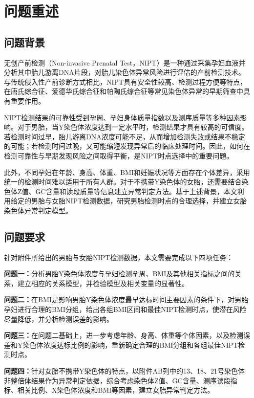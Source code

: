 \section{问题重述}

\subsection{问题背景}

无创产前检测（Non-invasive Prenatal Test，NIPT）是一种通过采集孕妇血液并分析其中胎儿游离DNA片段，对胎儿染色体异常风险进行评估的产前检测技术。与传统侵入性产前诊断方式相比，NIPT具有安全性较高、检测过程方便等特点，在唐氏综合征、爱德华氏综合征和帕陶氏综合征等常见染色体异常的早期筛查中具有重要作用。

NIPT检测结果的可靠性受到孕周、孕妇身体质量指数以及测序质量等多种因素影响。对于男胎，当Y染色体浓度达到一定水平时，检测结果才具有较高的可信度。若检测时间过早，胎儿游离DNA浓度可能不足，从而增加检测失败或结果不稳定的可能；若检测时间过晚，又可能缩短发现异常后的临床处理时间。因此，如何在检测可靠性与早期发现风险之间取得平衡，是NIPT时点选择中的重要问题。

此外，不同孕妇在年龄、身高、体重、BMI和妊娠状况等方面存在个体差异，采用统一的检测时间难以适用于所有人群。对于不携带Y染色体的女胎，还需要结合染色体Z值、GC含量和读段质量等信息建立异常判定方法。基于上述背景，本文利用给定的男胎与女胎NIPT检测数据，研究男胎检测时点的合理选择，并建立女胎染色体异常判定模型。

\subsection{问题要求}

针对附件所给出的男胎与女胎NIPT检测数据，本文需要完成以下四项任务：

\textbf{问题一：}分析男胎Y染色体浓度与孕妇检测孕周、BMI及其他相关指标之间的关系，建立相应的关系模型，并检验模型及相关变量的显著性。

\textbf{问题二：}在BMI是影响男胎Y染色体浓度最早达标时间主要因素的条件下，对男胎孕妇进行合理的BMI分组，给出各组BMI区间和最佳NIPT检测时点，使潜在风险尽量降低，并分析检测误差的影响。

\textbf{问题三：}在问题二基础上，进一步考虑年龄、身高、体重等个体因素，以及检测误差和Y染色体浓度达标比例的影响，重新确定合理的BMI分组和各组最佳NIPT检测时点。

\textbf{问题四：}针对女胎不携带Y染色体的特点，以附件AB列中的13、18、21号染色体非整倍体结果作为异常判定依据，综合考虑染色体Z值、GC含量、测序读段指标、相关比例、X染色体浓度和BMI等因素，建立女胎异常判定方法。

